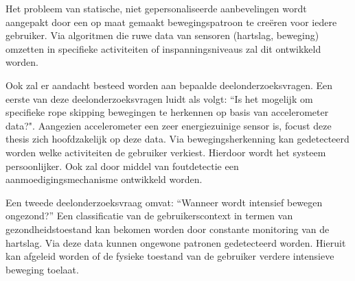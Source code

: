 Het probleem van statische, niet gepersonaliseerde aanbevelingen wordt aangepakt door een op maat gemaakt bewegingspatroon te creëren voor iedere gebruiker. Via algoritmen die ruwe data van sensoren (hartslag, beweging) omzetten in specifieke activiteiten of inspanningsniveaus zal dit ontwikkeld worden.  
 
Ook zal er aandacht besteed worden aan bepaalde deelonderzoeksvragen. Een eerste van deze deelonderzoeksvragen luidt als volgt: “Is het mogelijk om specifieke rope skipping bewegingen te herkennen op basis van accelerometer data?". Aangezien accelerometer een zeer energiezuinige sensor is, focust deze thesis zich hoofdzakelijk op deze data. Via bewegingsherkenning kan gedetecteerd worden welke activiteiten de gebruiker verkiest. Hierdoor wordt het systeem persoonlijker. Ook zal door middel van foutdetectie een aanmoedigingsmechanisme ontwikkeld worden. 
 
Een tweede deelonderzoeksvraag omvat: “Wanneer wordt intensief bewegen ongezond?” Een classificatie van de gebruikerscontext in termen van gezondheidstoestand kan bekomen worden door constante monitoring van de hartslag. Via deze data kunnen ongewone patronen gedetecteerd worden. Hieruit kan afgeleid worden of de fysieke toestand van de gebruiker verdere intensieve beweging toelaat. 
 
 
